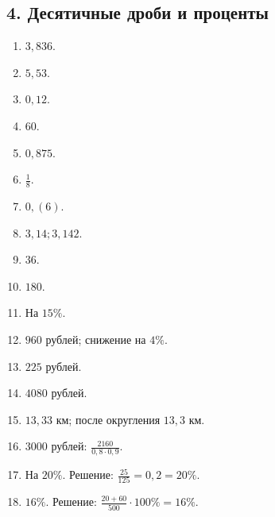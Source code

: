 \documentclass[12pt,a4paper]{article}
\theoremstyle{definition}
\theoremstyle{plain}
\theoremstyle{remark}
\newcommand{\starmark}{\ensuremath{{}^{\ast}}}
\begin{document}
\subsection*{4. Десятичные дроби и проценты}
\begin{enumerate}[label=4.\arabic*.,leftmargin=2.8em,itemsep=5pt]
\item \(3{,}836\).
\item \(5{,}53\).
\item \(0{,}12\).
\item \(60\).
\item \(0{,}875\).
\item \(\frac{1}{8}\).
\item \(0{,}(6)\).
\item \(3{,}14;\allowbreak 3{,}142\).
\item \(36\).
\item \(180\).
\item На \(15 \%\).
\item \(960\) рублей; снижение на \(4 \%\).
\item \(225\) рублей.
\item \(4080\) рублей.
\item \(13{,}33\) км; после округления \(13{,}3\) км.
\item[\textbf{4.16.}\starmark] \(3000\) рублей: \(\frac{2160}{0{,}8 \cdot  0{,}9}\).
\item[\textbf{4.17.}\starmark] На \(20 \%\). Решение: \(\frac{25}{125} = 0{,}2 = 20 \%\).
\item[\textbf{4.18.}\starmark] \(16 \%\). Решение: \(\frac{20 + 60}{500} \cdot 100 \% = 16 \%\).
\end{enumerate}
\end{document}
